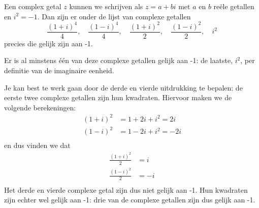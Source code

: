 \documentclass{ximera}
\begin{document}
\begin{exercise}
	Een complex getal $z$ kunnen we schrijven als $z=a+bi$ met $a$ en $b$ reële getallen en $i^2=-1$. Dan zijn er onder de lijst van complexe getallen
	\[ 
	\frac{(1+i)^4}{4}, \quad \frac{(1-i)^4}{4}, \quad\frac{(1+i)^2}{2},\quad \frac{(1-i)^2}{2}, \quad i^2 
	\] 
	precies  die gelijk zijn aan -1. 

\begin{oplossing}
Er is al minstens één van deze complexe getallen gelijk aan -1: de laatste, $i^2$, per definitie van de imaginaire eenheid. 

Je kan best te werk gaan door de derde en vierde uitdrukking te bepalen: de eerste twee complexe getallen zijn hun kwadraten. Hiervoor maken we de volgende berekeningen:
\begin{align*}
	(1+i)^2 &= 1 + 2i + i^2 = 2i  \\
	(1-i)^2 &= 1 - 2i + i^2 = -2i  \\	
\end{align*}
en dus vinden we dat
\begin{align*}
	\frac{(1+i)^2}{2} &= i  \\
	\frac{(1-i)^2}{2} &= -i  \\	
\end{align*}
Het derde en vierde complexe getal zijn dus niet gelijk aan -1. Hun kwadraten zijn echter wel gelijk aan -1: drie van de complexe getallen zijn dus gelijk aan -1. 
\end{oplossing}	
\end{exercise}
\end{document}
